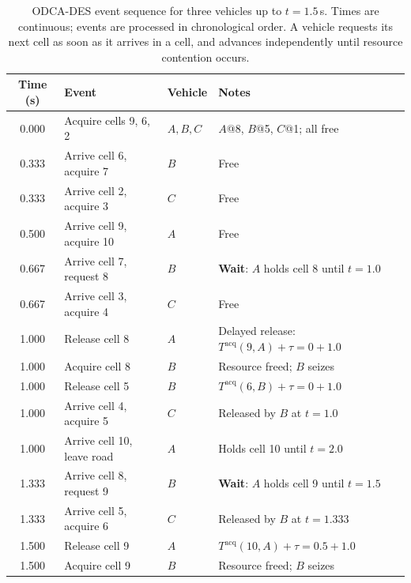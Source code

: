 \documentclass[review,number]{elsarticle}
\newcommand{\Tacq}{T^{\text{acq}}}
\begin{document}
\begin{table}[ht]
\centering
\caption{ODCA-DES event sequence for three vehicles up to $t = 1.5$\,s. Times are continuous; events are processed in chronological order. A vehicle requests its next cell as soon as it arrives in a cell, and advances independently until resource contention occurs.}
\label{tab:odca_example}
\begin{tabular}{@{}clll@{}}
\toprule
Time (s) & Event & Vehicle & Notes \\
\midrule
0.000 & Acquire cells 9, 6, 2 & $A,B,C$ & $A$@8, $B$@5, $C$@1; all free \\
0.333 & Arrive cell 6, acquire 7 & $B$ & Free \\
0.333 & Arrive cell 2, acquire 3 & $C$ & Free \\
0.500 & Arrive cell 9, acquire 10 & $A$ & Free \\
0.667 & Arrive cell 7, request 8 & $B$ & \textbf{Wait}: $A$ holds cell 8 until $t=1.0$ \\
0.667 & Arrive cell 3, acquire 4 & $C$ & Free \\
1.000 & Release cell 8 & $A$ & Delayed release: $\Tacq(9,A) + \tau = 0 + 1.0$ \\
1.000 & Acquire cell 8 & $B$ & Resource freed; $B$ seizes \\
1.000 & Release cell 5 & $B$ & $\Tacq(6,B) + \tau = 0 + 1.0$ \\
1.000 & Arrive cell 4, acquire 5 & $C$ & Released by $B$ at $t = 1.0$ \\
1.000 & Arrive cell 10, leave road & $A$ & Holds cell 10 until $t = 2.0$ \\
1.333 & Arrive cell 8, request 9 & $B$ & \textbf{Wait}: $A$ holds cell 9 until $t=1.5$ \\
1.333 & Arrive cell 5, acquire 6 & $C$ & Released by $B$ at $t = 1.333$ \\
1.500 & Release cell 9 & $A$ & $\Tacq(10,A) + \tau = 0.5 + 1.0$ \\
1.500 & Acquire cell 9 & $B$ & Resource freed; $B$ seizes \\
\bottomrule
\end{tabular}
\end{table}
\end{document}
